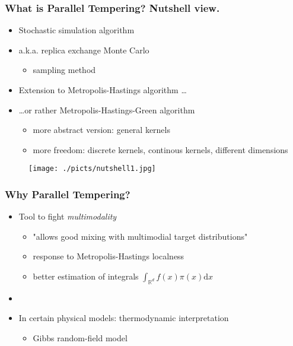 	\begin{frame}
		\frametitle{What is Parallel Tempering? Nutshell view.}
	
	\begin{itemize}
		\item Stochastic simulation algorithm
		\item a.k.a. replica exchange Monte Carlo 
		\begin{itemize}	
			\item sampling method  
		\end{itemize}
		\item Extension to Metropolis-Hastings algorithm \dots
		\item \dots or rather Metropolis-Hastings-Green algorithm 
		\begin{itemize}
			\item more abstract version: general kernels
			\item more freedom: discrete kernels, continous kernels, different dimensions  
		\end{itemize} 

	\end{itemize}	

	\begin{center}
		\begin{figure}\texttt{[image: ./picts/nutshell1.jpg]}\end{figure}	
	\end{center}

\end{frame}


\begin{frame}
		\frametitle{Why Parallel Tempering? }
	
	\begin{itemize}
		\item Tool to fight \emph{ multimodality }
		\begin{itemize}
			\item "allows good mixing with multimodial target distributions"
			\item response to Metropolis-Hastings localness    
			\item better estimation of integrals $ \int_{\mathbb{R}^d} f(x) \pi(x) \mathrm{d} x $
		\end{itemize}
		\item[] 

		\item In certain physical models: thermodynamic interpretation
		\begin{itemize}
			\item Gibbs random-field model
		\end{itemize}
	\end{itemize}	

\end{frame}

